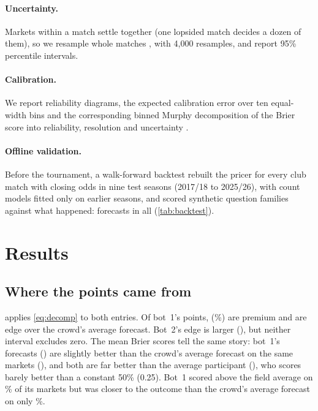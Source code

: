 \documentclass[11pt]{article}
\begin{document}
\paragraph{Uncertainty.}
Markets within a match settle together (one lopsided match decides a dozen of them), so we
resample whole matches \citep{efron1979, cameron2008}, with 4,000 resamples, and report 95\%
percentile intervals.

\paragraph{Calibration.}
We report reliability diagrams, the expected calibration error over ten equal-width bins
\citep{guo2017} and the corresponding binned Murphy decomposition of the Brier score into
reliability, resolution and uncertainty \citep{murphy1973, degroot1983}.

\paragraph{Offline validation.}
Before the tournament, a walk-forward backtest rebuilt the pricer for every club match with
closing odds in nine test seasons (2017/18 to 2025/26), with count models fitted only on
earlier seasons, and scored \BacktestFamilies{} synthetic question families against what
happened: \BacktestForecasts{} forecasts in all (\cref{tab:backtest}).

\section{Results}\label{sec:results}

\subsection{Where the points came from}

 applies \cref{eq:decomp} to both entries. Of bot~1's \PointsOne{} points,
\PremiumOne{} (\PremiumShareOne\%) are premium and \EdgeOne{} are edge over the crowd's average
forecast. Bot~2's edge is larger (\EdgeTwo{}), but neither interval excludes zero. The mean
Brier scores tell the same story: bot~1's forecasts (\BrierOne{}) are slightly better than the
crowd's average forecast on the same markets (\ConsensusBrierOne{}), and both are far better
than the average participant (\FieldBrierOne{}), who scores barely better than a constant 50\%
(0.25). Bot~1 scored above the field average on \AboveFieldOne\% of its markets but was closer
to the outcome than the crowd's average forecast on only \CloserOne\%.
\end{document}
